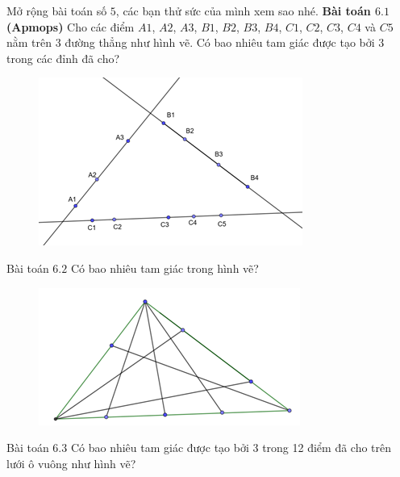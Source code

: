 \begin{multicols}{2}
	\vskip 0.1cm
	Mở rộng bài toán số $5$, các bạn thử sức của mình xem sao nhé.
	\vskip 0.1cm
		\textbf{\color{toancuabi}Bài toán $6.1$ (Apmops)}
		\vskip 0.1cm
		Cho các điểm $A1$, $A2$, $A3$, $B1$, $B2$, $B3$, $B4$, $C1$, $C2$, $C3$, $C4$ và $C5$ nằm trên $3$ đường thẳng như hình vẽ. Có bao nhiêu tam giác được tạo bởi $3$ trong các đỉnh đã cho?
		\begin{figure}[H]
			\centering
			\vspace*{-5pt}
			\captionsetup{labelformat=empty, justification=centering}
			\includegraphics[width=0.75\linewidth]{_10}
			\vspace*{-15pt}
		\end{figure}
		{Bài toán $6.2$}
		Có bao nhiêu tam giác trong hình vẽ?
		\begin{figure}[H]
			\centering
			\vspace*{-10pt}
			\captionsetup{labelformat=empty, justification=centering}
			\includegraphics[width=0.75\linewidth]{_11}
			\vspace*{-5pt}
		\end{figure}
		{Bài toán $6.3$}
		Có bao nhiêu tam giác được tạo bởi 3 trong 12 điểm đã cho trên lưới ô vuông như hình vẽ?
		\begin{figure}[H]

\end{figure}
\end{multicols}
